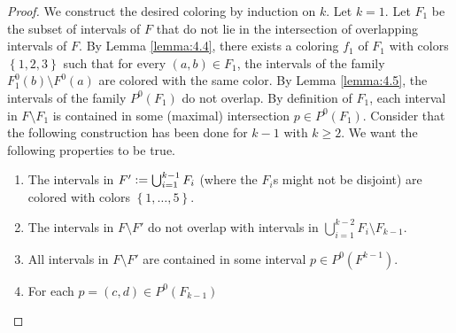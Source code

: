 \documentclass{article}
\theoremstyle{definition}
\newcommand{\defeq}{\vcentcolon=}
\begin{document}
    \begin{proof}
        We construct the desired
        coloring by induction
        on $k$. 
        Let $k = 1$.
        Let $F_1$ be the subset
        of intervals of $F$ that 
        do not lie in the intersection
        of overlapping intervals of $F$.
        By Lemma \ref{lemma:4.4},
        there exists a coloring
        $f_1$ of $F_1$ with colors
        $\left\{1,2,3\right\}$ such
        that for every $\left(a,b\right)
        \in F_1$, the intervals
        of the family $F^{0}_{1}
        \left(b\right) \setminus F^{0}\left(a\right)$
        are colored with the same
        color.
        By Lemma \ref{lemma:4.5},
        the intervals of the family
        $P^{0}\left(F_1\right)$ 
        do not overlap. By definition
        of $F_1$, each interval in 
        $F \setminus F_1$ is contained
        in some (maximal) intersection
        $p \in P^{0}\left(F_1\right)$.
        Consider that the following
        construction has been done
        for $k - 1$ with $k \geq 2$.
        We want the following properties
        to be true.
        \begin{enumerate}
            \item The intervals in
                $F' \defeq 
                \bigcup_{i=1}^{k-1} F_{i}$
                (where the $F_{i}$s
                might not be disjoint)
                are colored with colors
                $\left\{1, \ldots, 5\right\}$.
            \item The intervals in
                $F \setminus F'$ do not
                overlap with intervals
                in $\bigcup_{i=1}^{k-2}
                F_{i} \setminus F_{k-1}$.
                \label{cond:2}
            \item \label{cond:3} All intervals in 
                $F \setminus F'$ 
                are contained in some 
                interval $p \in 
                P^{0}\left(F^{k-1}\right)$.
            \item For each $p =
                \left(c, d\right) \in 
                P^{0}\left(F_{k-1}\right)$ 

\end{enumerate}
\end{proof}
\end{document}
